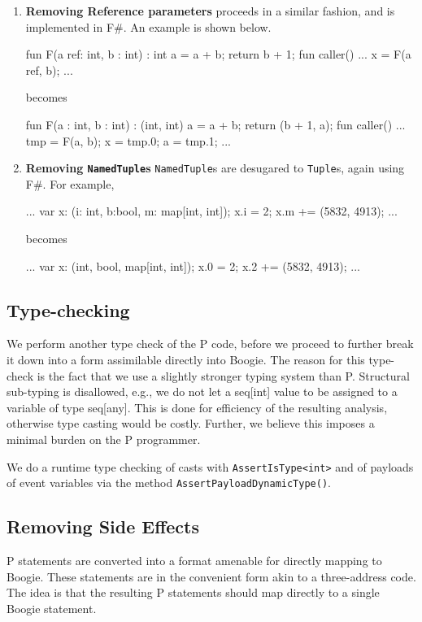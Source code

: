 \documentclass{llncs}
\newcommand{\fs}{F\#\xspace}
\begin{document}
\begin{enumerate}
\pagebreak

\item \textbf{Removing Reference parameters} proceeds in a similar fashion, and is implemented in \fs. An example is shown below.
\begin{psharpNoLines}
fun F(a ref: int, b : int) : int
{
  a = a + b;
  return b + 1;
}
fun caller()
{
  ...
  x = F(a ref, b);
  ...
}
\end{psharpNoLines}
becomes
\begin{psharpNoLines}
fun F(a : int, b : int) : (int, int)
{
  a = a + b;
  return (b + 1, a);
}
fun caller()
{
  ...
  tmp = F(a, b);
  x = tmp.0;
  a = tmp.1; 
  ...
}
\end{psharpNoLines}

\item \textbf{Removing \texttt{NamedTuple}s} \texttt{NamedTuple}s are desugared to \texttt{Tuple}s, again using \fs. For example,

\begin{psharpNoLines}
...
var x: (i: int, b:bool, m: map[int, int]);
x.i = 2;
x.m += (5832, 4913);
...
\end{psharpNoLines}

becomes

\begin{psharpNoLines}
...
var x: (int, bool, map[int, int]);
x.0 = 2;
x.2 += (5832, 4913);
...
\end{psharpNoLines}
\end{enumerate}

\subsection{Type-checking}
We perform another type check of the P code, before we proceed to further break it down into a form assimilable directly into Boogie. The reason for this type-check is the fact that we use a slightly stronger typing system than P. Structural sub-typing is disallowed, e.g., we do not let a seq[int] value to be assigned to a variable of type seq[any]. This is done for efficiency of the resulting analysis, otherwise type casting would be costly. Further, we believe this imposes a minimal burden on the P programmer.

We do a runtime type checking of casts with \texttt{AssertIsType<int>} and of payloads of event variables via the method \texttt{AssertPayloadDynamicType()}.

\subsection{Removing Side Effects}
P statements are converted into a format amenable for directly mapping to Boogie. These statements are in the convenient form akin to a three-address code. The idea is that the resulting P statements should map directly to a single Boogie statement.
\end{document}
